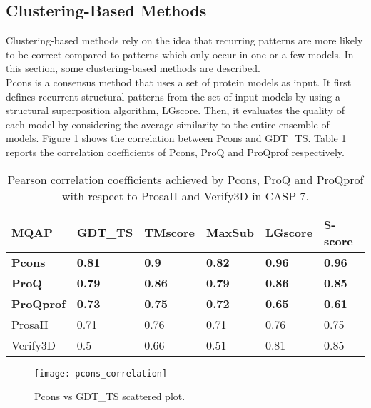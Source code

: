 \subsection{Clustering-Based Methods}
\label{subsec:clustering_based_methods}
Clustering-based methods rely on the idea that recurring patterns are more likely to be correct compared to patterns which only occur in one or a few models. In this section, some clustering-based methods are described.\\
Pcons \cite{Lundstrom2001, Wallner2007, Wallner2005, Wallner2006, Wallner2003} is a consensus method that uses a set of protein models as input. It first defines recurrent structural patterns from the set of input models by using a structural superposition algorithm, LGscore. Then, it evaluates the quality of each model by considering the average similarity to the entire ensemble of models. Figure \ref{fig:pcons_corr} shows the correlation between Pcons and GDT\_TS. Table \ref{tab:pcons_corr} reports the correlation coefficients of Pcons, ProQ and ProQprof respectively.\\
\begin{table}[tb]
\center
\begin{tabular}{llllll}
\toprule                %
\textbf{MQAP} & \textbf{GDT\_TS} & \textbf{TMscore} & \textbf{MaxSub} & \textbf{LGscore} & \textbf{S-score} \\
\midrule                %
	\textbf{Pcons}	&\textbf{0.81}	&\textbf{0.9}	&\textbf{0.82}	&\textbf{0.96}	&\textbf{0.96}\\
	\textbf{ProQ}	&\textbf{0.79}	&\textbf{0.86}	&\textbf{0.79}	&\textbf{0.86}	&\textbf{0.85}\\
	\textbf{ProQprof}	&\textbf{0.73}	&\textbf{0.75}	&\textbf{0.72}	&\textbf{0.65}	&\textbf{0.61}\\
	ProsaII		&0.71	&0.76	&0.71	&0.76	&0.75\\
	Verify3D	&0.5	&0.66	&0.51	&0.81	&0.85\\
\bottomrule                %
\end{tabular}
\caption[Pearson correlation coefficients achieved by Pcons, ProQ and ProQprof in CASP-7]{Pearson correlation coefficients achieved by Pcons, ProQ and ProQprof with respect to ProsaII and Verify3D in CASP-7.}
\label{tab:pcons_corr}
\end{table}
\begin{figure}[tb]
	\begin{center}
		\texttt{[image: pcons\_correlation]}
		\caption[Pcons vs GDT\_TS scattered plot]{Pcons vs GDT\_TS scattered plot.}
		\label{fig:pcons_corr}
	\end{center}
\end{figure}
